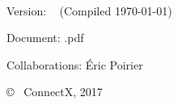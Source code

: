 
~

\vfill


Version: \versionNumber ~ (Compiled \today)

Document: \jobname.pdf

Collaborations: Éric Poirier

\copyright ~ ConnectX, 2017